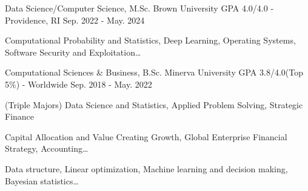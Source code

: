 \begin{cventries}
  \cventry
    {Data Science/Computer Science, M.Sc.}
    {Brown University}
    {GPA 4.0/4.0 - Providence, RI}
    {Sep. 2022 - May. 2024}
    {
    \begin{cvitems}
        \item {Computational Probability and Statistics, Deep Learning, Operating Systems, Software Security and Exploitation…}
    \end{cvitems}
    }

  \cventry
    {Computational Sciences \& Business, B.Sc.}
    {Minerva University}
    {GPA 3.8/4.0(Top 5\%) - Worldwide}
    {Sep. 2018 - May. 2022}
    {
      \begin{cvitems}
        \item {(Triple Majors)  Data Science and Statistics, Applied Problem Solving, Strategic Finance}
        \item {Capital Allocation and Value Creating Growth, Global Enterprise Financial Strategy, Accounting…}
        \item {Data structure, Linear optimization, Machine learning and decision making, Bayesian statistics…}
      \end{cvitems}
    }
\end{cventries}
